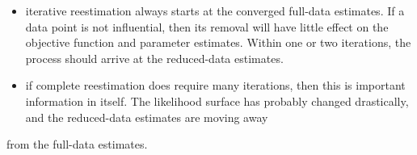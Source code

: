 \documentclass[12pt, a4paper]{article}
\begin{document}
\begin{itemize}
		\item iterative reestimation always starts at the converged full-data estimates. If a data point is not influential,
		then its removal will have little effect on the objective function and parameter estimates. Within
		one or two iterations, the process should arrive at the reduced-data estimates.
		\item if complete reestimation does require many iterations, then this is important information in itself. The
		likelihood surface has probably changed drastically, and the reduced-data estimates are moving away
\end{itemize}
	from the full-data estimates.
			
			
			
		
\end{document}
